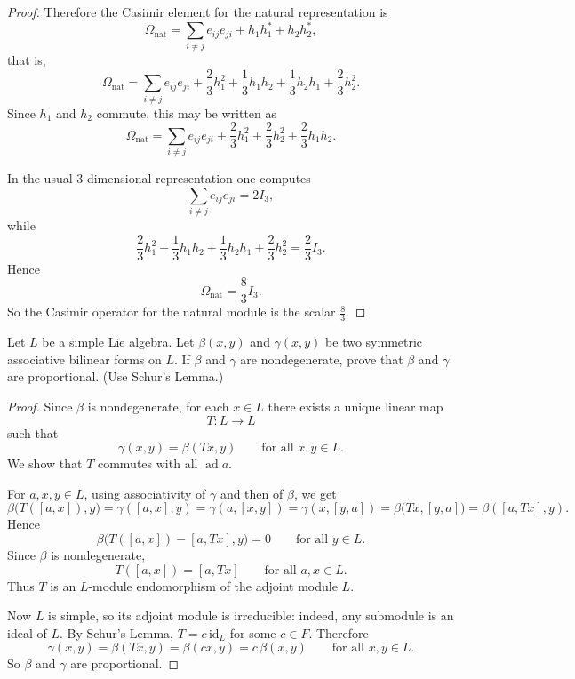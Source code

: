 \begin{proof}
    Therefore the Casimir element for the natural representation is
    \[
        \Omega_{\mathrm{nat}}
        =\sum_{i\neq j} e_{ij}e_{ji}
        +h_1h_1^*+h_2h_2^*,
    \]
    that is,
    \[
        \Omega_{\mathrm{nat}}
        =\sum_{i\neq j} e_{ij}e_{ji}
        +\frac23h_1^2+\frac13h_1h_2+\frac13h_2h_1+\frac23h_2^2.
    \]
    Since $h_1$ and $h_2$ commute, this may be written as
    \[
        \Omega_{\mathrm{nat}}
        =\sum_{i\neq j} e_{ij}e_{ji}
        +\frac23h_1^2+\frac23h_2^2+\frac23h_1h_2.
    \]

    In the usual $3$-dimensional representation one computes
    \[
        \sum_{i\neq j} e_{ij}e_{ji}=2I_3,
    \]
    while
    \[
        \frac23h_1^2+\frac13h_1h_2+\frac13h_2h_1+\frac23h_2^2=\frac23 I_3.
    \]
    Hence
    \[
        \Omega_{\mathrm{nat}}=\frac83 I_3.
    \]
    So the Casimir operator for the natural module is the scalar
    $\frac83$.
\end{proof}

\begin{exercise}\label{ex:w3.5}
    Let $L$ be a simple Lie algebra. Let $\beta(x,y)$ and $\gamma(x,y)$ be two symmetric associative bilinear forms on $L$. If $\beta$ and $\gamma$ are nondegenerate, prove that $\beta$ and $\gamma$ are proportional. (Use Schur's Lemma.)
\end{exercise}

\begin{proof}
    Since $\beta$ is nondegenerate, for each $x\in L$ there exists a unique linear map
    \[
        T:L\to L
    \]
    such that
    \[
        \gamma(x,y)=\beta(Tx,y)
        \qquad\text{for all }x,y\in L.
    \]
    We show that $T$ commutes with all $\operatorname{ad} a$.

    For $a,x,y\in L$, using associativity of $\gamma$ and then of $\beta$, we get
    \[
        \beta\bigl(T([a,x]),y\bigr)
        =\gamma([a,x],y)
        =\gamma(a,[x,y])
        =\gamma(x,[y,a])
        =\beta\bigl(Tx,[y,a]\bigr)
        =\beta([a,Tx],y).
    \]
    Hence
    \[
        \beta\bigl(T([a,x])-[a,Tx],y\bigr)=0
        \qquad\text{for all }y\in L.
    \]
    Since $\beta$ is nondegenerate,
    \[
        T([a,x])=[a,Tx]
        \qquad\text{for all }a,x\in L.
    \]
    Thus $T$ is an $L$-module endomorphism of the adjoint module $L$.

    Now $L$ is simple, so its adjoint module is irreducible: indeed, any submodule is an ideal of $L$. By Schur's Lemma, $T=c\,\mathrm{id}_L$ for some $c\in F$. Therefore
    \[
        \gamma(x,y)=\beta(Tx,y)=\beta(cx,y)=c\,\beta(x,y)
        \qquad\text{for all }x,y\in L.
    \]
    So $\beta$ and $\gamma$ are proportional.
\end{proof}

